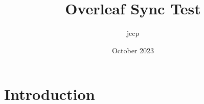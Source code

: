 \documentclass{article}
\title{Overleaf Sync Test}
\author{jccp }
\date{October 2023}
\begin{document}
\maketitle

\section{Introduction}
\end{document}
